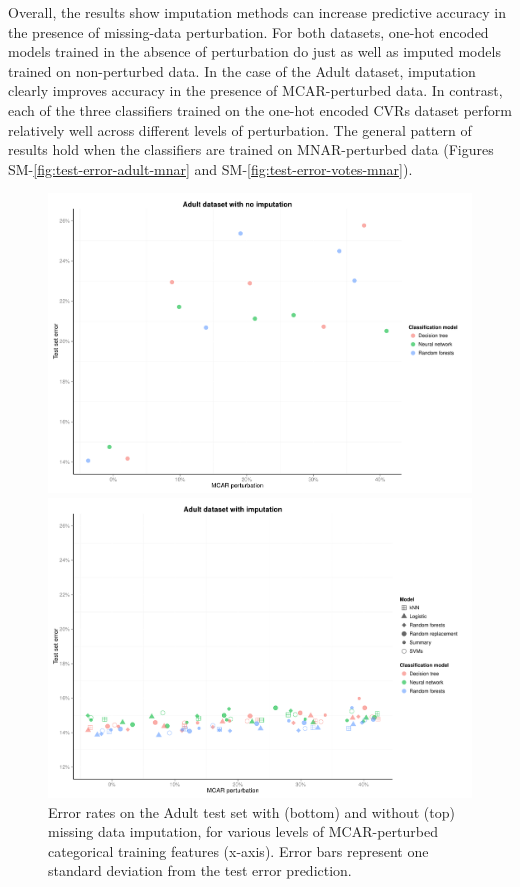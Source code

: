 \documentclass[10pt]{book}
\theoremstyle{definition}
\begin{document}
Overall, the results show imputation methods can increase predictive accuracy in the presence of missing-data perturbation. For both datasets, one-hot encoded models trained in the absence of perturbation do just as well as imputed models trained on non-perturbed data. In the case of the Adult dataset, imputation clearly improves accuracy in the presence of MCAR-perturbed data. In contrast, each of the three classifiers trained on the one-hot encoded CVRs dataset perform relatively well across different levels of perturbation. The general pattern of results hold when the classifiers are trained on MNAR-perturbed data (Figures SM-\ref{fig:test-error-adult-mnar} and SM-\ref{fig:test-error-votes-mnar}).

\begin{figure}[h!]
\includegraphics[scale=0.58, center]{figure/test-errors-adult-no-imp-mcar}\par
\includegraphics[scale=0.58, center]{figure/test-errors-adult-imp-mcar}\par
   \caption{\footnotesize Error rates on the Adult test set with (bottom) and without (top) missing data imputation, for various levels of MCAR-perturbed categorical training features (x-axis). Error bars represent one standard deviation from the test error prediction.}
   \label{fig:test-error-adult}
\end{figure}
\end{document}
